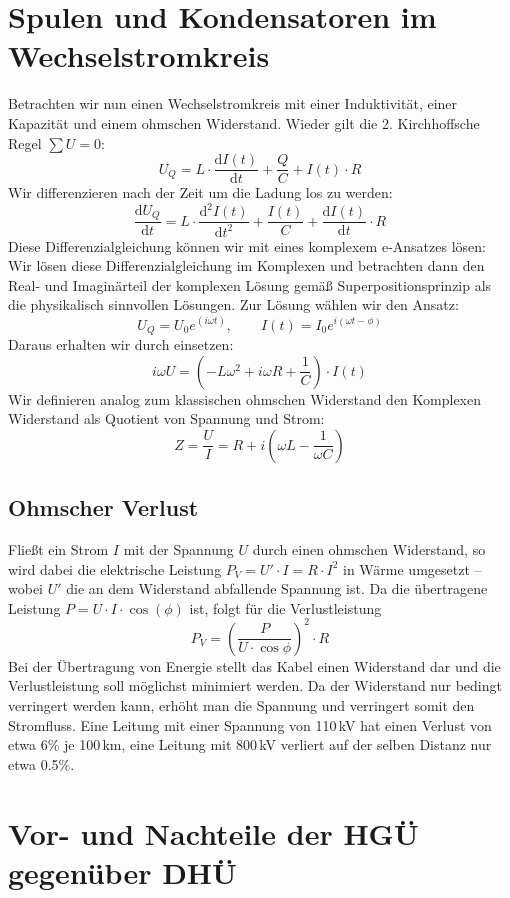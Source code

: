 \documentclass[10pt,a4paper,twoside]{article}
\begin{document}
\section{Spulen und Kondensatoren im Wechselstromkreis}
Betrachten wir nun einen Wechselstromkreis mit einer Induktivität, einer Kapazität und einem ohmschen Widerstand. Wieder gilt die 2. Kirchhoffsche Regel $\sum U = 0$:
\begin{equation}
U_Q = L \cdot \frac{\mathrm{d}I(t)}{\mathrm{d}t} + \frac{Q}{C} + I(t) \cdot R
\end{equation}
Wir differenzieren nach der Zeit um die Ladung los zu werden:
\begin{equation}
\frac{\mathrm dU_Q}{\mathrm dt} = L \cdot \frac{\mathrm{d^2}I(t)}{\mathrm{d}t^2} + \frac{I(t)}{C} + \frac{\mathrm dI(t)}{\mathrm dt} \cdot R
\end{equation}
Diese Differenzialgleichung können wir mit eines komplexem e-Ansatzes lösen:
Wir lösen diese Differenzialgleichung im Komplexen und betrachten dann den Real- und Imaginärteil der komplexen Lösung gemäß Superpositionsprinzip als die physikalisch sinnvollen Lösungen. Zur Lösung  wählen wir den Ansatz:
\begin{equation}
U_Q = U_0 e^{(i\omega t)},	\qquad	I(t) = I_0 e^{i(\omega t-\phi)}
\end{equation}
Daraus erhalten wir durch einsetzen:
\begin{equation}
i\omega U = (- L \omega^2 + i \omega R  + \frac{1}{C}) \cdot I(t)
\end{equation}
Wir definieren analog zum klassischen ohmschen Widerstand den Komplexen Widerstand als Quotient von Spannung und Strom:
\begin{equation}
Z = \frac{U}{I} = R + i ( \omega L - \frac{1}{\omega C})
\end{equation}


\subsection{Ohmscher Verlust}
Fließt ein Strom $I$ mit der Spannung $U$ durch einen ohmschen Widerstand, so wird dabei die elektrische Leistung
$P_V = U' \cdot I = R \cdot I^2$
in Wärme umgesetzt -- wobei $U'$ die an dem Widerstand abfallende Spannung ist.
Da die übertragene Leistung $P=U \cdot I \cdot \cos(\phi)$ ist, folgt für die Verlustleistung
\[P_V = \left(\frac{P}{U \cdot \cos\phi}\right)^2\cdot R\]
Bei der Übertragung von Energie stellt das Kabel einen Widerstand dar und die Verlustleistung soll möglichst minimiert werden. Da der Widerstand nur bedingt verringert werden kann, erhöht man die Spannung und verringert somit den Stromfluss. Eine Leitung mit einer Spannung von 110\,kV hat einen Verlust von etwa 6\% je 100\,km, eine Leitung mit 800\,kV verliert auf der selben Distanz nur etwa 0.5\%.

\section{Vor- und Nachteile der HGÜ gegenüber DHÜ}
\end{document}
